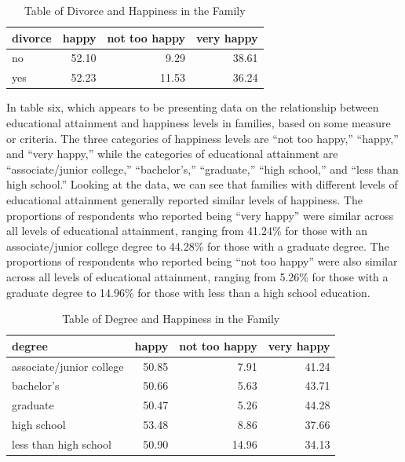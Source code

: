 \documentclass[
  letterpaper,
  DIV=11,
  numbers=noendperiod]{scrartcl}
\begin{document}
\begin{table}

\caption{Table of Divorce and Happiness in the Family}
\centering
\begin{tabular}[t]{l|r|r|r}
\hline
divorce & happy & not too happy & very happy\\
\hline
no & 52.10 & 9.29 & 38.61\\
\hline
yes & 52.23 & 11.53 & 36.24\\
\hline
\end{tabular}
\end{table}

In table six, which appears to be presenting data on the relationship
between educational attainment and happiness levels in families, based
on some measure or criteria. The three categories of happiness levels
are ``not too happy,'' ``happy,'' and ``very happy,'' while the
categories of educational attainment are ``associate/junior college,''
``bachelor's,'' ``graduate,'' ``high school,'' and ``less than high
school.'' Looking at the data, we can see that families with different
levels of educational attainment generally reported similar levels of
happiness. The proportions of respondents who reported being ``very
happy'' were similar across all levels of educational attainment,
ranging from 41.24\% for those with an associate/junior college degree
to 44.28\% for those with a graduate degree. The proportions of
respondents who reported being ``not too happy'' were also similar
across all levels of educational attainment, ranging from 5.26\% for
those with a graduate degree to 14.96\% for those with less than a high
school education.

\begin{table}

\caption{Table of Degree and Happiness in the Family}
\centering
\begin{tabular}[t]{l|r|r|r}
\hline
degree & happy & not too happy & very happy\\
\hline
associate/junior college & 50.85 & 7.91 & 41.24\\
\hline
bachelor's & 50.66 & 5.63 & 43.71\\
\hline
graduate & 50.47 & 5.26 & 44.28\\
\hline
high school & 53.48 & 8.86 & 37.66\\
\hline
less than high school & 50.90 & 14.96 & 34.13\\
\hline
\end{tabular}
\end{table}
\end{document}

